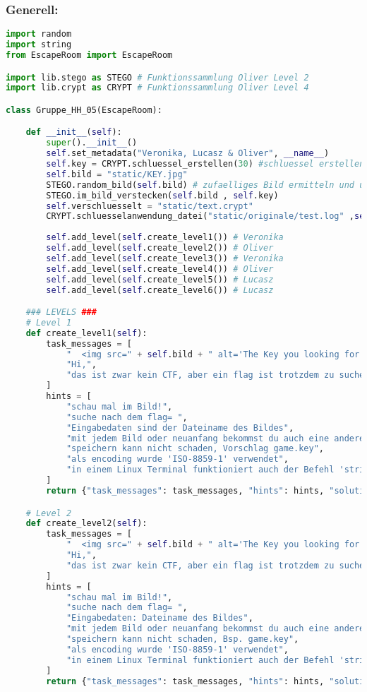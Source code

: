 \documentclass[a4paper 11pt]{article}
\begin{document}
\subsubsection{Generell:}
\begin{lstlisting}[language=python, caption=Genereller Escape-Room]
import random
import string
from EscapeRoom import EscapeRoom

import lib.stego as STEGO # Funktionssammlung Oliver Level 2
import lib.crypt as CRYPT # Funktionssammlung Oliver Level 4

class Gruppe_HH_05(EscapeRoom):

    def __init__(self):
        super().__init__()
        self.set_metadata("Veronika, Lucasz & Oliver", __name__)
        self.key = CRYPT.schluessel_erstellen(30) #schluessel erstellen
        self.bild = "static/KEY.jpg"
        STEGO.random_bild(self.bild) # zufaelliges Bild ermitteln und umkopieren
        STEGO.im_bild_verstecken(self.bild , self.key)
        self.verschluesselt = "static/text.crypt"
        CRYPT.schluesselanwendung_datei("static/originale/test.log" ,self.verschluesselt ,self.key )
        
        self.add_level(self.create_level1()) # Veronika
        self.add_level(self.create_level2()) # Oliver
        self.add_level(self.create_level3()) # Veronika
        self.add_level(self.create_level4()) # Oliver
        self.add_level(self.create_level5()) # Lucasz
        self.add_level(self.create_level6()) # Lucasz

    ### LEVELS ###
    # Level 1
    def create_level1(self):
        task_messages = [
            "  <img src=" + self.bild + " alt='The Key you looking for' height='150'/> ",
            "Hi,",
			"das ist zwar kein CTF, aber ein flag ist trotzdem zu suchen",
        ]
        hints = [
            "schau mal im Bild!",
            "suche nach dem flag= ",
            "Eingabedaten sind der Dateiname des Bildes",
            "mit jedem Bild oder neuanfang bekommst du auch eine andere flag",
            "speichern kann nicht schaden, Vorschlag game.key",
            "als encoding wurde 'ISO-8859-1' verwendet",
            "in einem Linux Terminal funktioniert auch der Befehl 'strings [Dateiname]' "
        ]
        return {"task_messages": task_messages, "hints": hints, "solution_function": STEGO.im_bild_finden, "data": self.bild}

    # Level 2
    def create_level2(self):
        task_messages = [
            "  <img src=" + self.bild + " alt='The Key you looking for' height='150'/> ",
            "Hi,",
			"das ist zwar kein CTF, aber ein flag ist trotzdem zu suchen"
        ]
        hints = [
            "schau mal im Bild!",
            "suche nach dem flag= ",
            "Eingabedaten: Dateiname des Bildes",
            "mit jedem Bild oder neuanfang bekommst du auch eine andere flag",
            "speichern kann nicht schaden, Bsp. game.key",
            "als encoding wurde 'ISO-8859-1' verwendet",
            "in einem Linux Terminal funktioniert auch der Befehl 'strings [Dateiname]' "
        ]
        return {"task_messages": task_messages, "hints": hints, "solution_function": STEGO.im_bild_finden, "data": self.bild}


\end{lstlisting}
\end{document}
